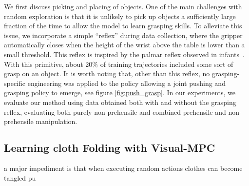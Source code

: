 We first discuss picking and placing of objects. One of the main challenges with random exploration is that it is unlikely to pick up objects a sufficiently large fraction of the time to allow the model to learn grasping skills. To alleviate this issue, we incorporate a simple ``reflex'' during data collection, where the gripper automatically closes when the height of the wrist above the table is lower than a small threshold. This reflex is inspired by the palmar reflex observed in infants~\cite{grasping_fetal}. With this primitive, about 20\% of training trajectories included some sort of grasp on an object. It is worth noting that, other than this reflex, no grasping-specific engineering was applied to the policy allowing a joint pushing and grasping policy to emerge, see figure \ref{fig:push_grasp}. In our experiments, we evaluate our method using data obtained both with and without the grasping reflex, evaluating both purely non-prehensile and combined prehensile and non-prehensile manipulation.

\subsection{Learning cloth Folding with Visual-MPC}
 a major impediment is that when executing random actions clothes can become tangled pu

